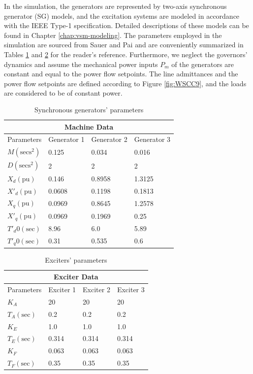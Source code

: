 In the simulation, the generators are represented by two-axis synchronous
generator (SG) models, and the excitation systems are modeled in accordance with
the IEEE Type-1 specification. Detailed descriptions of these models can be
found in Chapter \ref{chap:vsm-modeling}. The parameters employed in the
simulation are sourced from Sauer and Pai \cite{sauer2017power} and are
conveniently summarized in Tables \ref{tab:gen_params} and \ref{tab:avr_params}
for the reader's reference. Furthermore, we neglect the governors' dynamics and
assume the mechanical power inputs $P_m$ of the generators are constant and
equal to the power flow setpoints. The line admittances and the power flow
setpoints are defined according to Figure \ref{fig:WSCC9}, and the loads are
considered to be of constant power.

\begin{table}[h!]
    \centering
    \begin{tabular}{@{}llll@{}}
        \toprule
        \multicolumn{4}{c}{\textbf{Machine Data}} \\
        \midrule
        Parameters & Generator 1 & Generator 2 & Generator 3 \\
        \midrule
        \( M(\text{secs}^2) \) & 0.125 & 0.034 & 0.016 \\
        \( D(\text{secs}^2) \) & 2 & 2 & 2 \\
        \( X_d(\text{pu}) \) & 0.146 & 0.8958 & 1.3125 \\
        \( X'_d(\text{pu}) \) & 0.0608 & 0.1198 & 0.1813 \\
        \( X_q(\text{pu}) \) & 0.0969 & 0.8645 & 1.2578 \\
        \( X'_q(\text{pu}) \) & 0.0969 & 0.1969 & 0.25 \\
        \( T'_d0(\text{sec}) \) & 8.96 & 6.0 & 5.89 \\
        \( T'_q0(\text{sec}) \) & 0.31 & 0.535 & 0.6 \\
        \bottomrule
    \end{tabular}
    \caption{Synchronous generators' parameters}
    \label{tab:gen_params}
\end{table}
    
\begin{table}[h!]
    \centering
    \begin{tabular}{@{}llll@{}}
    \toprule
    \multicolumn{4}{c}{\textbf{Exciter Data}} \\
    \midrule
    Parameters & Exciter 1 & Exciter 2 & Exciter 3 \\
    \midrule
    \( K_A \) & 20 & 20 & 20 \\
    \( T_A(\text{sec}) \) & 0.2 & 0.2 & 0.2 \\
    \( K_E \) & 1.0 & 1.0 & 1.0 \\
    \( T_E(\text{sec}) \) & 0.314 & 0.314 & 0.314 \\
    \( K_F \) & 0.063 & 0.063 & 0.063 \\
    \( T_F(\text{sec}) \) & 0.35 & 0.35 & 0.35 \\
    \bottomrule
    \end{tabular}
    \caption{Exciters' parameters}
    \label{tab:avr_params}
\end{table}

